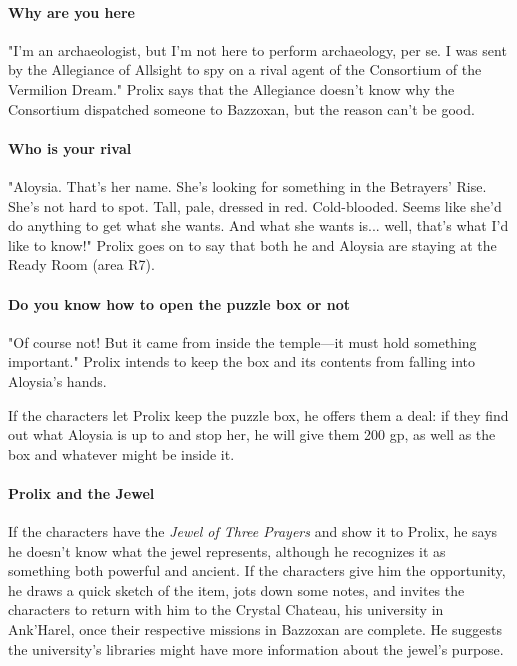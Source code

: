 \documentclass[a4paper, 11pt, bg=full, twocolumn, nooutline]{dndbook}
\begin{document}
\paragraph{Why are you here}

"I'm an archaeologist, but I'm not here to perform archaeology, per se. I was sent by the Allegiance of Allsight to spy on a rival agent of the Consortium of the Vermilion Dream." Prolix says that the Allegiance doesn't know why the Consortium dispatched someone to Bazzoxan, but the reason can't be good.

\paragraph{Who is your rival}

"Aloysia. That's her name. She's looking for something in the Betrayers' Rise. She's not hard to spot. Tall, pale, dressed in red. Cold-blooded. Seems like she'd do anything to get what she wants. And what she wants is... well, that's what I'd like to know!" Prolix goes on to say that both he and Aloysia are staying at the Ready Room (area R7).

\paragraph{Do you know how to open the puzzle box or not}

"Of course not! But it came from inside the temple---it must hold something important." Prolix intends to keep the box and its contents from falling into Aloysia's hands.

If the characters let Prolix keep the puzzle box, he offers them a deal: if they find out what Aloysia is up to and stop her, he will give them 200 gp, as well as the box and whatever might be inside it.

\paragraph{Prolix and the Jewel}

If the characters have the \textit{Jewel of Three Prayers} and show it to Prolix, he says he doesn't know what the jewel represents, although he recognizes it as something both powerful and ancient. If the characters give him the opportunity, he draws a quick sketch of the item, jots down some notes, and invites the characters to return with him to the Crystal Chateau, his university in Ank'Harel, once their respective missions in Bazzoxan are complete. He suggests the university's libraries might have more information about the jewel's purpose.
\end{document}
